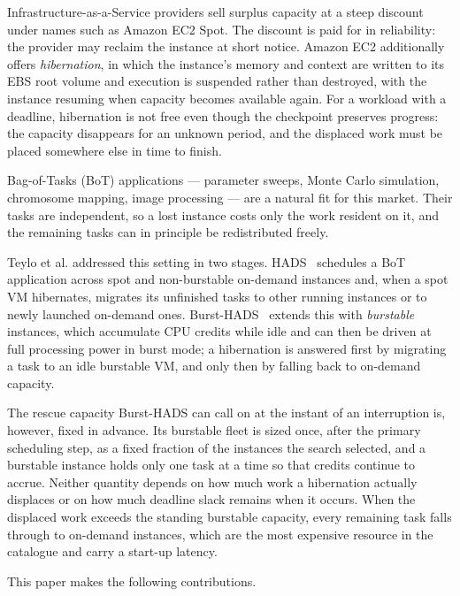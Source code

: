 \documentclass[conference]{IEEEtran}
\begin{document}
Infrastructure-as-a-Service providers sell surplus capacity at a steep discount
under names such as Amazon EC2 Spot. The discount is paid for in reliability:
the provider may reclaim the instance at short notice. Amazon EC2 additionally
offers \emph{hibernation}, in which the instance's memory and context are
written to its EBS root volume and execution is suspended rather than
destroyed, with the instance resuming when capacity becomes available again.
For a workload with a deadline, hibernation is not free even though the
checkpoint preserves progress: the capacity disappears for an unknown period,
and the displaced work must be placed somewhere else in time to finish.

Bag-of-Tasks (BoT) applications --- parameter sweeps, Monte Carlo simulation,
chromosome mapping, image processing --- are a natural fit for this market.
Their tasks are independent, so a lost instance costs only the work resident on
it, and the remaining tasks can in principle be redistributed freely.

Teylo et al. addressed this setting in two stages. HADS~\cite{hads2021}
schedules a BoT application across spot and non-burstable on-demand instances
and, when a spot VM hibernates, migrates its unfinished tasks to other running
instances or to newly launched on-demand ones. Burst-HADS~\cite{bursthads}
extends this with \emph{burstable} instances, which accumulate CPU credits
while idle and can then be driven at full processing power in burst mode; a
hibernation is answered first by migrating a task to an idle burstable VM,
and only then by falling back to on-demand capacity.

The rescue capacity Burst-HADS can call on at the instant of an interruption
is, however, fixed in advance. Its burstable fleet is sized once, after the
primary scheduling step, as a fixed fraction of the instances the search
selected, and a burstable instance holds only one task at a time so that
credits continue to accrue. Neither quantity depends on how much work a
hibernation actually displaces or on how much deadline slack remains when it
occurs. When the displaced work exceeds the standing burstable capacity, every
remaining task falls through to on-demand instances, which are the most
expensive resource in the catalogue and carry a start-up latency.

This paper makes the following contributions.
\end{document}

